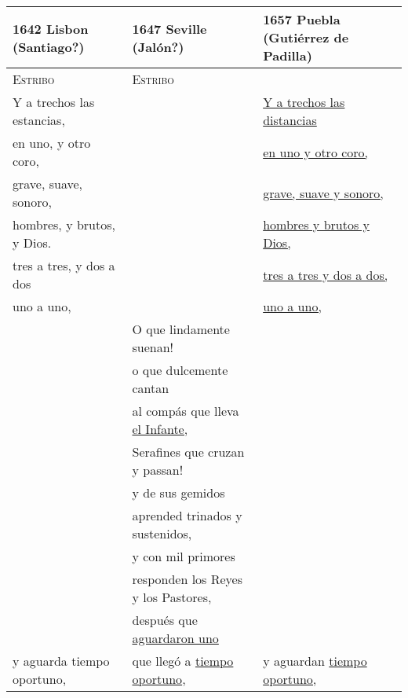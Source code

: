 \begin{tabular}{lll}
    \toprule
    1642 Lisbon (Santiago?) & 
    1647 Seville (Jalón?) & 
    1657 Puebla (Gutiérrez de Padilla) \\
    \midrule 
 
    \textsc{Estribo} &
    \textsc{Estribo} &
    \\

    \strophe{} Y a trechos las estancias, &
    &
    \strophe{} \uline{Y a trechos las distancias} \\

    en uno, y otro coro, &
    &
    \uline{en uno y otro coro,} \\

    grave, suave, sonoro, &
    &
    \uline{grave, suave y sonoro,} \\

    hombres, y brutos, y Dios. &
    &
    \uline{hombres y brutos y Dios,} \\

    tres a tres, y dos a dos &
    &
    \uline{tres a tres y dos a dos,} \\

    uno a uno, &
    &
    \uline{uno a uno,} \\
    
    & 
    O que lindamente suenan! 
    & \\
    
    & 
    o que dulcemente cantan 
    & \\
    
    & 
    al compás que lleva \uline{el Infante,} 
    & \\
    
    & 
    Serafines que cruzan y passan! 
    & \\
    
    & 
    y de sus gemidos 
    & \\
    
    & 
    aprended trinados y sustenidos, 
    & \\
    
    & 
    y con mil primores 
    & \\ 
    
    & 
    responden los Reyes y los Pastores, 
    & \\
 
    & 
    después que \uline{aguardaron uno} 
    & \\

    y aguarda tiempo oportuno, &
    que llegó a \uline{tiempo oportuno}, &
    y aguardan \uline{tiempo oportuno,} \\ 
    

\end{tabular}
